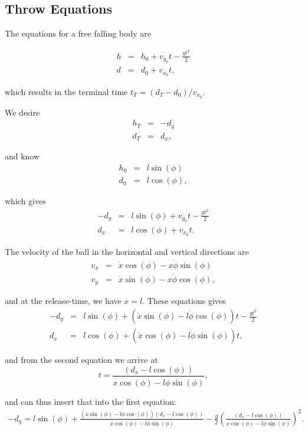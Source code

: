 \subsection{Throw Equations}

The equations for a free falling body are

\begin{eqnarray*}
h & = & h_{0}+v_{y_{0}}t-\frac{gt^{2}}{2}\\
d & = & d_{0}+v_{x_{0}}t,
\end{eqnarray*}


which results in the terminal time $t_{T}=(d_{T}-d_{0})/v_{x_{0}}$.

We desire 
\begin{eqnarray*}
h_{T} & = & -d_{y}\\
d_{T} & = & d_{x},
\end{eqnarray*}


and know
\begin{eqnarray*}
h_{0} & = & l\sin(\phi)\\
d_{0} & = & l\cos(\phi),
\end{eqnarray*}


which gives
\begin{eqnarray*}
-d_{y} & = & l\sin(\phi)+v_{y_{0}}t-\frac{gt^{2}}{2}\\
d_{x} & = & l\cos(\phi)+v_{x_{0}}t.
\end{eqnarray*}


The velocity of the ball in the horizontal and vertical directions
are
\begin{eqnarray*}
v_{x} & = & \dot{x}\cos(\phi)-x\dot{\phi}\sin(\phi)\\
v_{y} & = & \dot{x}\sin(\phi)-x\dot{\phi}\cos(\phi),
\end{eqnarray*}


and at the release-time, we have $x=l$. These equations gives
\begin{eqnarray*}
-d_{y} & = & l\sin(\phi)+\left(\dot{x}\sin(\phi)-l\dot{\phi}\cos(\phi)\right)t-\frac{gt^{2}}{2}\\
d_{x} & = & l\cos(\phi)+\left(\dot{x}\cos(\phi)-l\dot{\phi}\sin(\phi)\right)t,
\end{eqnarray*}


and from the second equation we arrive at 
\[
t=\frac{\left(d_{x}-l\cos(\phi)\right)}{\dot{x}\cos(\phi)-l\dot{\phi}\sin(\phi)},
\]


and can thus insert that into the first equation:
\begin{gather*}
-d_{y}=l\sin(\phi)+\frac{\left(\dot{x}\sin(\phi)-l\dot{\phi}\cos(\phi)\right)\left(d_{x}-l\cos(\phi)\right)}{\dot{x}\cos(\phi)-l\dot{\phi}\sin(\phi)}-\frac{g}{2}\left(\frac{\left(d_{x}-l\cos(\phi)\right)}{\dot{x}\cos(\phi)-l\dot{\phi}\sin(\phi)}\right)^{2}.
\end{gather*}



